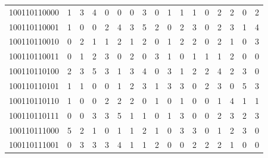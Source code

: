 \documentclass[10pt,a4paper]{article}
\begin{document}
\begin{longtable}{ |c|c|c|c|c|c|c|c|c|c|c|c|c|c|c|c|c| }
    100110110000              & 1                            & 3                                & 4                            & 0                              & 0   & 0   & 3   & 0   & 1   & 1   & 1   & 0   & 2   & 2   & 0   & 2   \\
    100110110001              & 1                            & 0                                & 0                            & 2                              & 4   & 3   & 5   & 2   & 0   & 2   & 3   & 0   & 2   & 3   & 1   & 4   \\
    100110110010              & 0                            & 2                                & 1                            & 1                              & 2   & 1   & 2   & 0   & 1   & 2   & 2   & 0   & 2   & 1   & 0   & 3   \\
    100110110011              & 0                            & 1                                & 2                            & 3                              & 0   & 2   & 0   & 3   & 1   & 0   & 1   & 1   & 1   & 2   & 0   & 0   \\
    100110110100              & 2                            & 3                                & 5                            & 3                              & 1   & 3   & 4   & 0   & 3   & 1   & 2   & 2   & 4   & 2   & 3   & 0   \\
    100110110101              & 1                            & 1                                & 0                            & 0                              & 1   & 2   & 3   & 1   & 3   & 3   & 0   & 2   & 3   & 0   & 5   & 3   \\
    100110110110              & 1                            & 0                                & 0                            & 2                              & 2   & 2   & 0   & 1   & 0   & 1   & 0   & 0   & 1   & 4   & 1   & 1   \\
    100110110111              & 0                            & 0                                & 3                            & 3                              & 5   & 1   & 1   & 0   & 1   & 3   & 0   & 0   & 2   & 3   & 2   & 3   \\
    100110111000              & 5                            & 2                                & 1                            & 0                              & 1   & 1   & 2   & 1   & 0   & 3   & 3   & 0   & 1   & 2   & 3   & 0   \\
    100110111001              & 0                            & 3                                & 3                            & 3                              & 4   & 1   & 1   & 2   & 0   & 0   & 2   & 2   & 2   & 1   & 0   & 0   \\

\end{longtable}
\end{document}

